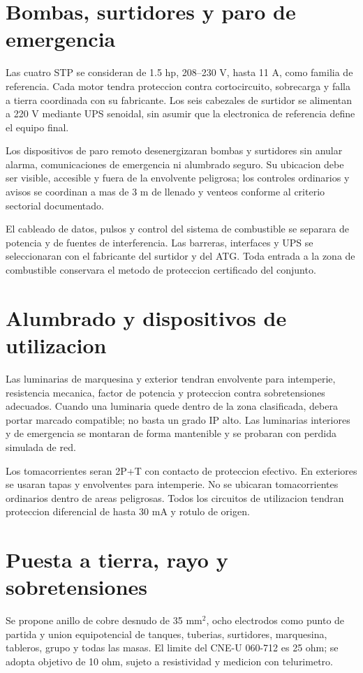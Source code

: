 \section{Bombas, surtidores y paro de emergencia}
Las cuatro STP se consideran de 1.5 hp, 208--230 V, hasta 11 A, como familia de referencia. Cada motor tendra proteccion contra cortocircuito, sobrecarga y falla a tierra coordinada con su fabricante. Los seis cabezales de surtidor se alimentan a 220 V mediante UPS senoidal, sin asumir que la electronica de referencia define el equipo final.

Los dispositivos de paro remoto desenergizaran bombas y surtidores sin anular alarma, comunicaciones de emergencia ni alumbrado seguro. Su ubicacion debe ser visible, accesible y fuera de la envolvente peligrosa; los controles ordinarios y avisos se coordinan a mas de 3 m de llenado y venteos conforme al criterio sectorial documentado.

El cableado de datos, pulsos y control del sistema de combustible se separara de
potencia y de fuentes de interferencia. Las barreras, interfaces y UPS se
seleccionaran con el fabricante del surtidor y del ATG. Toda entrada a la zona de
combustible conservara el metodo de proteccion certificado del conjunto.

\section{Alumbrado y dispositivos de utilizacion}
Las luminarias de marquesina y exterior tendran envolvente para intemperie,
resistencia mecanica, factor de potencia y proteccion contra sobretensiones
adecuados. Cuando una luminaria quede dentro de la zona clasificada, debera portar
marcado compatible; no basta un grado IP alto. Las luminarias interiores y de
emergencia se montaran de forma mantenible y se probaran con perdida simulada de
red.

Los tomacorrientes seran 2P+T con contacto de proteccion efectivo. En exteriores
se usaran tapas y envolventes para intemperie. No se ubicaran tomacorrientes
ordinarios dentro de areas peligrosas. Todos los circuitos de utilizacion tendran
proteccion diferencial de hasta 30 mA y rotulo de origen.

\section{Puesta a tierra, rayo y sobretensiones}
Se propone anillo de cobre desnudo de 35 mm\(^2\), ocho electrodos como punto de partida y union equipotencial de tanques, tuberias, surtidores, marquesina, tableros, grupo y todas las masas. El limite del CNE-U 060-712 es 25 ohm; se adopta objetivo de 10 ohm, sujeto a resistividad y medicion con telurimetro.

